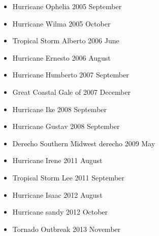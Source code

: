 \begin{multicols}{2}
\begin{itemize}
\item Hurricane Ophelia 2005 September
\item Hurricane Wilma 2005 October
\item Tropical Storm Alberto 2006 June
\item Hurricane Ernesto 2006 August
\item Hurricane Humberto 2007 September
\item Great Coastal Gale of 2007 December
\item Hurricane Ike 2008 September
\item Hurricane Gustav 2008 September
\item Derecho Southern Midwest derecho 2009 May
\item Hurricane Irene 2011 August
\item Tropical Storm Lee 2011 September
\item Hurricane Isaac 2012 August
\item Hurricane sandy 2012 October
\item Tornado Outbreak 2013 November
\end{itemize}
\end{multicols}
